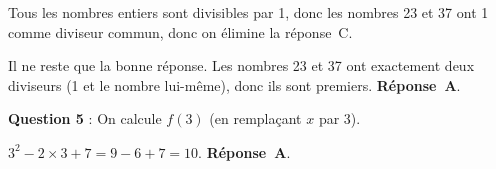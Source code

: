 \documentclass[10pt]{article}
\begin{document}
Tous les nombres entiers sont divisibles par 1, donc les nombres 23 et 37 ont 1 comme diviseur commun, donc on élimine la réponse~C.

Il ne reste que la bonne réponse. Les nombres 23 et 37 ont exactement deux diviseurs (1 et le nombre lui-même), donc ils sont premiers. \textbf{Réponse~A}.

\textbf{Question 5} : On calcule $f(3)$ (en remplaçant $x$ par 3). 

$3^2 - 2\times 3+7 = 9 - 6 + 7 =  10$. \quad  \textbf{Réponse~A}. 

\vspace{0.5cm}
\end{document}

